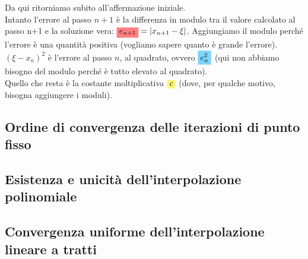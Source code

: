 Da qui ritorniamo subito all'affermazione iniziale.\\
Intanto l'errore al passo $n+1$ è la differenza in modulo tra il valore calcolato al passo n+1 e la soluzione vera: $\highlightRED{e_{n+1}}=|x_{n+1}-\xi|$. Aggiungiamo il modulo perché l'errore è una quantità positiva (vogliamo sapere quanto è grande l'errore).\\
$(\xi - x_n)^2$ è l'errore al passo $n$, al quadrato, ovvero $\highlightCYAN{e_n^2}$ (qui non abbiamo bisogno del modulo perché è tutto elevato al quadrato).\\
Quello che resta è la costante moltiplicativa $\highlightYELLOW{c}$ (dove, per qualche motivo, bisogna aggiungere i moduli).

\subsection{Ordine di convergenza delle iterazioni di punto fisso}

\subsection{Esistenza e unicità dell'interpolazione polinomiale}

\subsection{Convergenza uniforme dell'interpolazione lineare a tratti}

